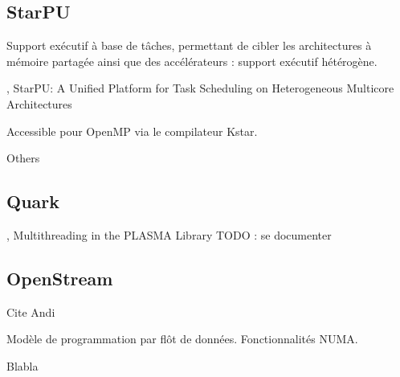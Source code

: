 \subsection{StarPU}

Support exécutif à base de tâches, permettant de cibler les architectures à mémoire partagée ainsi que des accélérateurs : support exécutif hétérogène.

\cite{StarPU}, StarPU: A Unified Platform for Task Scheduling on Heterogeneous Multicore Architectures

Accessible pour OpenMP via le compilateur Kstar.

Others

\subsection{Quark}

\cite{Kurzak2013}, Multithreading in the PLASMA Library
TODO : se documenter

\subsection{OpenStream}

Cite Andi

Modèle de programmation par flôt de données.
Fonctionnalités NUMA.


Blabla
